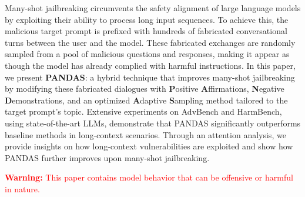 Many-shot jailbreaking circumvents the safety alignment of large language models by exploiting their ability to process long input sequences. To achieve this, the malicious target prompt is prefixed with hundreds of fabricated conversational turns between the user and the model. These fabricated exchanges are randomly sampled from a pool of malicious questions and responses, making it appear as though the model has already complied with harmful instructions. In this paper, we present \textbf{PANDAS}: a hybrid technique that improves many-shot jailbreaking by modifying these fabricated dialogues with \textbf{P}ositive \textbf{A}ffirmations, \textbf{N}egative \textbf{D}emonstrations, and an optimized \textbf{A}daptive \textbf{S}ampling method tailored to the target prompt's topic. Extensive experiments on AdvBench and HarmBench, using state-of-the-art LLMs, demonstrate that PANDAS significantly outperforms baseline methods in long-context scenarios. Through an attention analysis, we provide insights on how long-context vulnerabilities are exploited and show how PANDAS further improves upon many-shot jailbreaking.

\textcolor{red}{\textbf{Warning:} This paper contains model behavior that can be offensive or harmful in nature.}